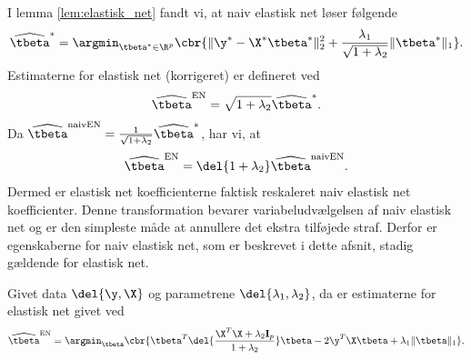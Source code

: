 I lemma \ref{lem:elastisk_net} fandt vi, at naiv elastisk net løser følgende 
\begin{align}
\widehat{\tbeta}^* = \argmin_{\tbeta^* \in \R^p} \cbr{ \Vert \y^* - \X^* \tbeta^* \Vert_2^2 + \frac{\lambda_1}{\sqrt{1+\lambda_2}} \Vert \tbeta^* \Vert_1}. \label{eq:EN8}
\end{align}
Estimaterne for elastisk net (korrigeret) er defineret ved
\begin{align*}
\widehat{\tbeta}^\text{EN} = \sqrt{1+\lambda_2} \widehat{\tbeta}^*.
\end{align*}
Da \(\widehat{\tbeta}^\text{naivEN} = \frac{1}{\sqrt{1+\lambda_2}} \widehat{\tbeta}^*\), har vi, at
\begin{align*}
\widehat{\tbeta}^\text{EN} = \del{1+\lambda_2} \widehat{\tbeta}^\text{naivEN}.
\end{align*}
Dermed er elastisk net koefficienterne faktisk reskaleret naiv elastisk net koefficienter.
Denne transformation bevarer variabeludvælgelsen af naiv elastisk net og er den simpleste måde at annullere det ekstra tilføjede straf.
Derfor er egenskaberne for naiv elastisk net, som er beskrevet i dette afsnit, stadig gældende for elastisk net.
%
\begin{thm} \label{thm:elastisk_net2}
Givet data \(\del{\y, \X}\) og parametrene \(\del{\lambda_1, \lambda_2}\), da er estimaterne for elastisk net givet ved
\begin{align}
\widehat{\tbeta}^\text{EN} = \argmin_{\tbeta} \cbr{ \tbeta^T \del{\frac{\X^T \X + \lambda_2 \mathbf{I}_p}{1 + \lambda_2}} \tbeta - 2 \y^T \X \tbeta + \lambda_1 \Vert \tbeta \Vert_1}. \label{eq:EN6}
\end{align}
\end{thm}
